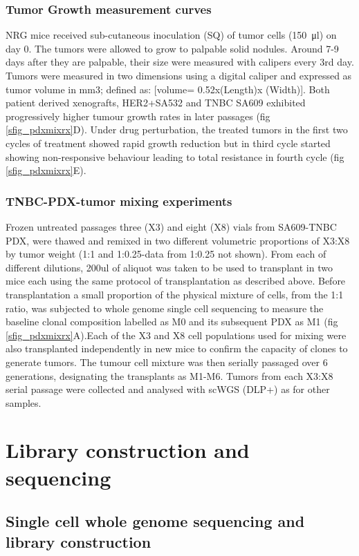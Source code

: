 \documentclass{article}
\begin{document}
\subsubsection{Tumor Growth measurement curves} 
NRG mice received sub-cutaneous inoculation (SQ) of tumor cells (\SI{150}{\ul}) on day 0. 
The tumors were allowed to grow to palpable solid nodules.
Around 7-9 days after they are palpable, their size were measured with calipers every 3rd day. 
Tumors were measured in two dimensions using a digital caliper and expressed as tumor volume in mm3; defined as: [volume= 0.52x(Length)x (Width)].
Both patient derived xenografts, HER2+SA532 and TNBC SA609 exhibited progressively higher tumour growth rates in later passages (fig \ref{sfig_pdxmixrx}D). Under drug perturbation, the treated tumors in the first two cycles of treatment showed rapid growth reduction but in third cycle started showing non-responsive behaviour leading to total resistance in fourth cycle  (fig \ref{sfig_pdxmixrx}E).

\subsubsection{TNBC-PDX-tumor mixing experiments}
Frozen untreated passages three (X3) and eight (X8) vials from SA609-TNBC PDX, were thawed and  remixed in two different volumetric proportions of X3:X8 by tumor weight (1:1 and 1:0.25-data from 1:0.25 not shown). From each of different dilutions, 200ul of aliquot was taken to be used to transplant in two mice each using the same protocol of transplantation as described above. Before transplantation a small proportion of the physical mixture of cells, from the 1:1 ratio, was subjected to whole genome single cell sequencing to measure the baseline clonal composition labelled as M0 and its subsequent PDX as M1 (fig \ref{sfig_pdxmixrx}A).Each of the X3 and X8 cell populations used for mixing were also transplanted independently in new mice to confirm the capacity of clones to generate tumors. The tumour cell mixture was then serially passaged over 6 generations, designating the transplants as M1-M6. Tumors from each X3:X8 serial passage were collected and analysed with scWGS (DLP+) as for other samples.


\section{Library construction and sequencing}

\subsection{Single cell whole genome sequencing and library construction}
\end{document}
